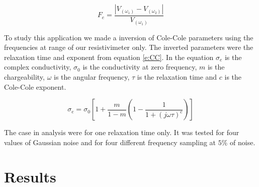 \documentclass{vie16}
\begin{document}
\begin{equation}
	F_{e} = \frac{ |V_{(\omega_{1})} - V_{(\omega_{2})}| }{V_{(\omega_{1})}}
	\label{e:FE}
\end{equation}


To study this application we made a inversion of Cole-Cole parameters using the frequencies
at range of our resistivimeter only. The inverted parameters were the relaxation time and exponent
from equation \ref{e:CC}. In the equation $\sigma_{e}$ is the complex conductivity, $\sigma_{0}$ is the
conductivity at zero frequency, $m$ is the chargeability, $\omega$ is the angular frequency, $\tau$ is the relaxation time
and $c$ is the Cole-Cole exponent.

\begin{equation}
	\sigma_{e} = \sigma_{0}
			\left[
			1 + \frac{m}{1-m}
						\left( 
								1 - \frac{1}{1+ \left( j\omega\tau \right)^{c} }	
						\right) 			
			\right]
	\label{e:CC}
\end{equation}

The case in analysis were for one relaxation time only. It was tested for four values of Gaussian noise and 
for four different frequency sampling at $5\%$ of noise.


\section{Results}
\end{document}
